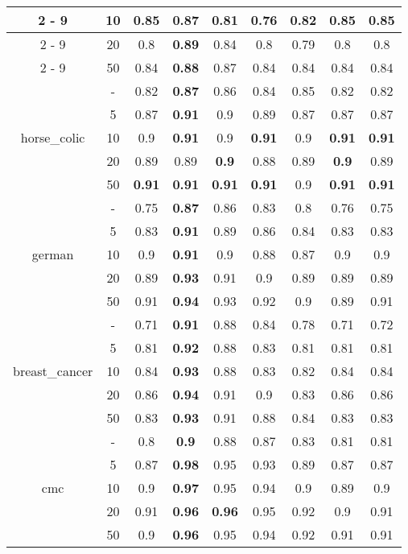 \documentclass{article}%
\begin{document}
\begin{longtable}{c|c|ccccccc}
\cline{2%
-%
9}%
&10&0.85&\textbf{0.87}&0.81&0.76&0.82&0.85&0.85\\%
\cline{2%
-%
9}%
&20&0.8&\textbf{0.89}&0.84&0.8&0.79&0.8&0.8\\%
\cline{2%
-%
9}%
&50&0.84&\textbf{0.88}&0.87&0.84&0.84&0.84&0.84\\%
\hline%
\multirow{5}{*}{horse\_colic}&{-}&0.82&\textbf{0.87}&0.86&0.84&0.85&0.82&0.82\\%
\cline{2%
-%
9}%
&5&0.87&\textbf{0.91}&0.9&0.89&0.87&0.87&0.87\\%
\cline{2%
-%
9}%
&10&0.9&\textbf{0.91}&0.9&\textbf{0.91}&0.9&\textbf{0.91}&\textbf{0.91}\\%
\cline{2%
-%
9}%
&20&0.89&0.89&\textbf{0.9}&0.88&0.89&\textbf{0.9}&0.89\\%
\cline{2%
-%
9}%
&50&\textbf{0.91}&\textbf{0.91}&\textbf{0.91}&\textbf{0.91}&0.9&\textbf{0.91}&\textbf{0.91}\\%
\hline%
\multirow{5}{*}{german}&{-}&0.75&\textbf{0.87}&0.86&0.83&0.8&0.76&0.75\\%
\cline{2%
-%
9}%
&5&0.83&\textbf{0.91}&0.89&0.86&0.84&0.83&0.83\\%
\cline{2%
-%
9}%
&10&0.9&\textbf{0.91}&0.9&0.88&0.87&0.9&0.9\\%
\cline{2%
-%
9}%
&20&0.89&\textbf{0.93}&0.91&0.9&0.89&0.89&0.89\\%
\cline{2%
-%
9}%
&50&0.91&\textbf{0.94}&0.93&0.92&0.9&0.89&0.91\\%
\hline%
\multirow{5}{*}{breast\_cancer}&{-}&0.71&\textbf{0.91}&0.88&0.84&0.78&0.71&0.72\\%
\cline{2%
-%
9}%
&5&0.81&\textbf{0.92}&0.88&0.83&0.81&0.81&0.81\\%
\cline{2%
-%
9}%
&10&0.84&\textbf{0.93}&0.88&0.83&0.82&0.84&0.84\\%
\cline{2%
-%
9}%
&20&0.86&\textbf{0.94}&0.91&0.9&0.83&0.86&0.86\\%
\cline{2%
-%
9}%
&50&0.83&\textbf{0.93}&0.91&0.88&0.84&0.83&0.83\\%
\hline%
\multirow{5}{*}{cmc}&{-}&0.8&\textbf{0.9}&0.88&0.87&0.83&0.81&0.81\\%
\cline{2%
-%
9}%
&5&0.87&\textbf{0.98}&0.95&0.93&0.89&0.87&0.87\\%
\cline{2%
-%
9}%
&10&0.9&\textbf{0.97}&0.95&0.94&0.9&0.89&0.9\\%
\cline{2%
-%
9}%
&20&0.91&\textbf{0.96}&\textbf{0.96}&0.95&0.92&0.9&0.91\\%
\cline{2%
-%
9}%
&50&0.9&\textbf{0.96}&0.95&0.94&0.92&0.91&0.91\\%

\end{longtable}
\end{document}
